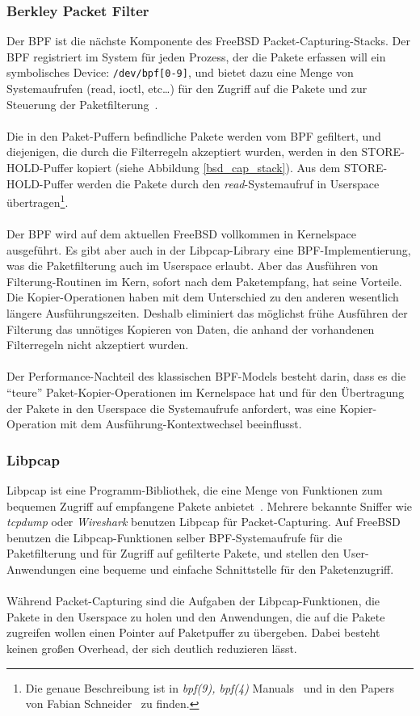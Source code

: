 \subsubsection{Berkley Packet Filter}\label{sec:bpf}
Der BPF ist die nächste Komponente des FreeBSD Packet-Capturing-Stacks. Der BPF
registriert im System für jeden Prozess, der die Pakete erfassen will ein
symbolisches Device: \verb+/dev/bpf[0-9]+, und bietet dazu eine Menge von
Systemaufrufen (read, ioctl, etc\ldots) für den Zugriff auf die Pakete und zur
Steuerung der Paketfilterung~\cite{man_kernel_bpf, man_bpf, bpf_paper}.\\\\
%
Die in den Paket-Puffern befindliche Pakete werden vom BPF gefiltert, und
diejenigen, die durch die Filterregeln akzeptiert wurden, werden in den
STORE-HOLD-Puffer kopiert (siehe Abbildung \ref{bsd_cap_stack}).  Aus dem
STORE-HOLD-Puffer werden die Pakete durch den \emph{read}-Systemaufruf in
Userspace übertragen\footnote{Die genaue Beschreibung ist in \emph{bpf(9),
bpf(4)} Manuals~\cite{man_kernel_bpf, man_bpf} und in den Papers von Fabian
Schneider~\cite{fabian_da, pcin10gb_paper} zu finden.}.\\\\
%
Der BPF wird auf dem aktuellen FreeBSD vollkommen in Kernelspace ausgeführt.
Es gibt aber auch in der Libpcap-Library eine BPF-Implementierung, was  die
Paketfilterung auch im Userspace erlaubt. Aber das Ausführen von
Filterung-Routinen im Kern, sofort nach dem Paketempfang, hat seine Vorteile.
Die Kopier-Operationen haben mit dem Unterschied zu den anderen wesentlich
längere Ausführungszeiten. Deshalb eliminiert das möglichst frühe Ausführen der
Filterung  das unnötiges Kopieren von Daten, die anhand der vorhandenen
Filterregeln nicht akzeptiert wurden.\\\\
%
Der Performance-Nachteil des klassischen BPF-Models besteht darin, dass es die
``teure'' Paket-Kopier-Operationen im Kernelspace hat und für den Übertragung
der Pakete in den Userspace die Systemaufrufe anfordert, was eine
Kopier-Operation mit dem Ausführung-Kontextwechsel beeinflusst.

\subsubsection{Libpcap}\label{sec:libpcap}
Libpcap ist eine Programm-Bibliothek, die eine Menge von Funktionen zum
bequemen Zugriff auf empfangene Pakete anbietet~\cite{man_pcap}. Mehrere
bekannte Sniffer wie \emph{tcpdump} oder \emph{Wireshark} benutzen Libpcap für
Packet-Capturing.  Auf FreeBSD benutzen die Libpcap-Funktionen  selber
BPF-Systemaufrufe für die Paketfilterung und für Zugriff auf gefilterte Pakete,
und stellen den User-Anwendungen eine bequeme und einfache Schnittstelle für
den Paketenzugriff.\\\\
%
Während Packet-Capturing sind die Aufgaben der Libpcap-Funktionen, die Pakete in den
Userspace zu holen und den Anwendungen, die auf die Pakete zugreifen wollen einen
Pointer auf Paketpuffer zu übergeben. Dabei besteht keinen großen Overhead, der 
sich deutlich reduzieren lässt.


